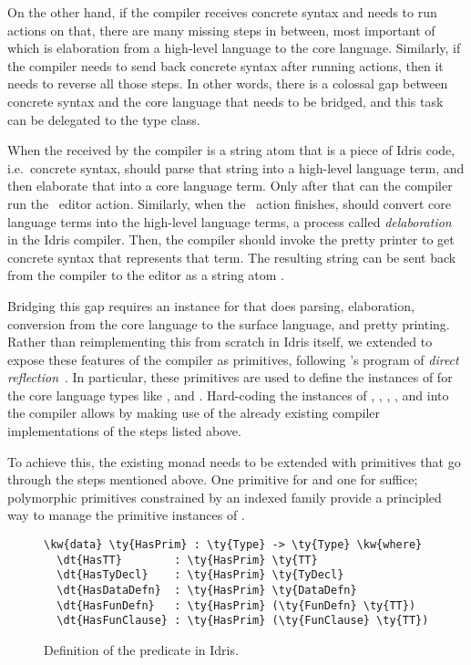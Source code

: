 On the other hand, if the compiler receives concrete syntax and needs to run \Elab{}
actions on that, there are many missing steps in between, most important of
which is elaboration from a high-level language to the core language.
Similarly, if the compiler needs to send back concrete syntax after
running \Elab{} actions, then it needs to reverse all those steps.
In other words, there is a colossal gap between concrete syntax and the core
language that needs to be bridged, and this task can be delegated to the
\Editorable{} type class.

When the \sexp{} received by the compiler is a string atom that is a
piece of Idris code, i.e.\ concrete syntax,  should parse that
string into a high-level language term, and then elaborate that into a core
language term. Only after that can the compiler run the \Elab\ editor action.
Similarly, when the \Elab\ action finishes,  should convert core
language terms into the high-level language terms, a process called
\emph{delaboration} in the Idris compiler.
Then, the compiler should invoke the pretty printer to get concrete syntax that
represents that term. The resulting string can be sent back from the compiler
to the editor as a string atom \sexp{}.

Bridging this gap requires an \Editorable{} instance for \TT{} that does parsing,
elaboration, conversion from the core language to the surface language, and pretty printing.
Rather than reimplementing this from scratch in Idris itself, we extended \Elab{}
to expose these features of the compiler as primitives, following \citeauthor{barzilayphd}'s program of \emph{direct reflection}~\citep{barzilayphd}.
In particular, these primitives are used to define the instances of \Editorable{}
for the core language types like \TT{}, \TyDecl{} and \FunDefn{}.
Hard-coding the \Editorable{} instances of , ,
, , and  into the compiler
allows  by making use
of the already existing compiler implementations of the steps listed above.

To achieve this, the existing \Elab{} monad needs to be extended with
primitives that go through the steps mentioned above.  One \Elab{} primitive
for  and one for  suffice; polymorphic
primitives constrained by an indexed family provide a principled
way to manage the primitive instances of \Editorable{}.

\begin{figure}[H]
\begin{Verbatim}
\kw{data} \ty{HasPrim} : \ty{Type} -> \ty{Type} \kw{where}
  \dt{HasTT}        : \ty{HasPrim} \ty{TT}
  \dt{HasTyDecl}    : \ty{HasPrim} \ty{TyDecl}
  \dt{HasDataDefn}  : \ty{HasPrim} \ty{DataDefn}
  \dt{HasFunDefn}   : \ty{HasPrim} (\ty{FunDefn} \ty{TT})
  \dt{HasFunClause} : \ty{HasPrim} (\ty{FunClause} \ty{TT})
\end{Verbatim}
\caption{Definition of the  predicate in Idris.}
\end{figure}


